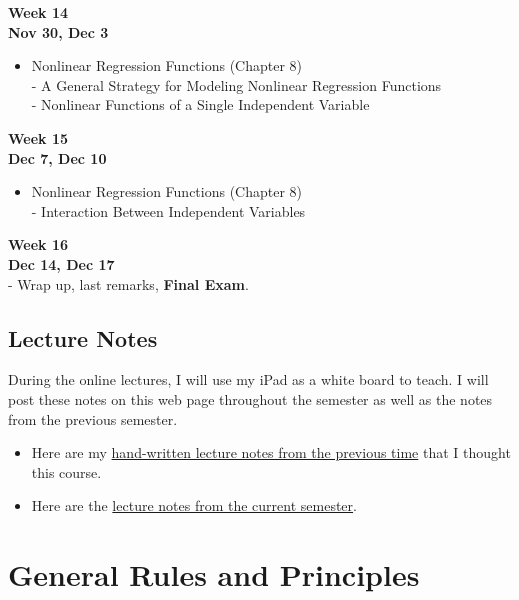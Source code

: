 \documentclass[
]{book}
\providecommand{\tightlist}{%
  \setlength{\itemsep}{0pt}\setlength{\parskip}{0pt}}
\begin{document}
\textbf{Week 14}\\
\textbf{Nov 30, Dec 3}

\begin{itemize}
\tightlist
\item
  Nonlinear Regression Functions (Chapter 8)\\
  - A General Strategy for Modeling Nonlinear Regression Functions\\
  - Nonlinear Functions of a Single Independent Variable
\end{itemize}

\textbf{Week 15}\\
\textbf{Dec 7, Dec 10}

\begin{itemize}
\tightlist
\item
  Nonlinear Regression Functions (Chapter 8)\\
  - Interaction Between Independent Variables
\end{itemize}

\textbf{Week 16}\\
\textbf{Dec 14, Dec 17}\\
- Wrap up, last remarks, \textbf{Final Exam}.

\hypertarget{lecture-notes}{%
\section*{Lecture Notes}\label{lecture-notes}}

During the online lectures, I will use my iPad as a white board to teach. I will post these notes on this web page throughout the semester as well as the notes from the previous semester.

\begin{itemize}
\item
  Here are my \href{https://www.dropbox.com/s/kng2oynyxrtiir5/EC\%20282\%20SPRING\%202020.pdf?dl=0}{hand-written lecture notes from the previous time} that I thought this course.
\item
  Here are the \href{https://www.dropbox.com/s/e5c8qax19lkrrn3/EC\%20282\%20FALL\%202020.pdf?dl=0}{lecture notes from the current semester}.
\end{itemize}

\hypertarget{general-rules-and-principles}{%
\chapter{General Rules and Principles}\label{general-rules-and-principles}}
\end{document}
